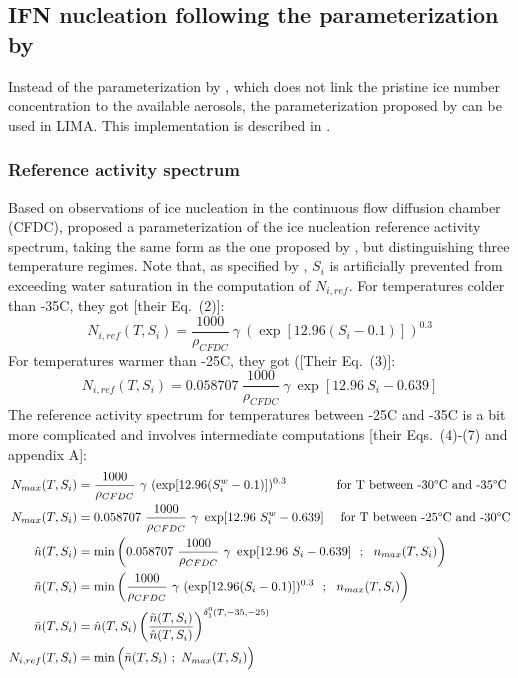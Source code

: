 \subsection{IFN nucleation following the parameterization by \citet{Phillips2008}}

Instead of the parameterization by \citet{Meyers1992}, which does not link the pristine ice number concentration to the available aerosols, the parameterization proposed by \citet{Phillips2008,Phillips2013} can be used in LIMA. This implementation is described in \citet{Berthet2010these,Vie2016}.

\subsubsection{Reference activity spectrum}

Based on observations of ice nucleation in the continuous flow diffusion chamber (CFDC), \citet{Phillips2008} proposed a parameterization of the ice nucleation reference activity spectrum, taking the same form as the one proposed by \citet{Meyers1992}, but distinguishing three temperature regimes. Note that, as specified by \citet{Phillips2008}, $S_i$ is artificially prevented from exceeding water saturation in the computation of $N_{i,ref}$. For temperatures colder than -35\textdegree C, they got [their Eq.\ (2)]:
\begin{equation}
 N_{i,ref} (T,S_i) = \frac{1000}{\rho_{CFDC}} ~ \gamma ~ (\exp[12.96 (S_i-0.1)])^{0.3}
\end{equation}
For temperatures warmer than -25\textdegree C, they got ([Their Eq.\ (3)]:
\begin{equation}
 N_{i,ref} (T,S_i) = 0.058707 ~ \frac{1000}{\rho_{CFDC}} ~ \gamma ~ \exp[12.96 ~ S_i - 0.639]
\end{equation}
The reference activity spectrum for temperatures between -25\textdegree C and -35\textdegree C is a bit more complicated and involves intermediate computations [their Eqs.\ (4)-(7) and appendix A]:
\begin{align}
 N_{max}(T,S_i) &= \frac{1000}{\rho_{CFDC}} ~ \gamma ~ (\exp[12.96 (S_i^w-0.1)])^{0.3} \quad \quad \quad \quad \text{for T between -30\textdegree C and -35\textdegree C} \\
 N_{max}(T,S_i) &= 0.058707 ~ \frac{1000}{\rho_{CFDC}} ~ \gamma ~ \exp[12.96 ~ S_i^w - 0.639] \quad \text{ for T between -25\textdegree C and -30\textdegree C} \\
 \hat{n}(T,S_i) &= \min\bigg( 0.058707 ~ \frac{1000}{\rho_{CFDC}} ~ \gamma ~ \exp[12.96 ~ S_i - 0.639] ~ ~ ; ~ ~ n_{max}(T,S_i) \bigg) \\
 \tilde{n}(T,S_i) &= \min\bigg( \frac{1000}{\rho_{CFDC}} ~ \gamma ~ (\exp[12.96 (S_i-0.1)])^{0.3} ~ ~ ; ~ ~ n_{max}(T,S_i) \bigg) \\
 \bar{n}(T,S_i) &= \hat{n}(T,S_i) \left( \frac{\tilde{n}(T,S_i)}{\hat{n}(T,S_i)} \right)^{\delta_1^0(T,-35,-25)} \\
 N_{i,ref} (T,S_i) &= \min\Big( \bar{n}(T,S_i) ~ ; ~ N_{max}(T,S_i) \Big)
\end{align}

